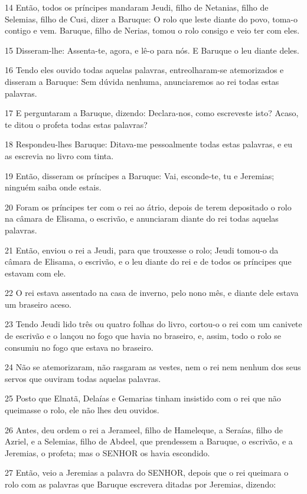 \par 14 Então, todos os príncipes mandaram Jeudi, filho de Netanias, filho de Selemias, filho de Cusi, dizer a Baruque: O rolo que leste diante do povo, toma-o contigo e vem. Baruque, filho de Nerias, tomou o rolo consigo e veio ter com eles.
\par 15 Disseram-lhe: Assenta-te, agora, e lê-o para nós. E Baruque o leu diante deles.
\par 16 Tendo eles ouvido todas aquelas palavras, entreolharam-se atemorizados e disseram a Baruque: Sem dúvida nenhuma, anunciaremos ao rei todas estas palavras.
\par 17 E perguntaram a Baruque, dizendo: Declara-nos, como escreveste isto? Acaso, te ditou o profeta todas estas palavras?
\par 18 Respondeu-lhes Baruque: Ditava-me pessoalmente todas estas palavras, e eu as escrevia no livro com tinta.
\par 19 Então, disseram os príncipes a Baruque: Vai, esconde-te, tu e Jeremias; ninguém saiba onde estais.
\par 20 Foram os príncipes ter com o rei ao átrio, depois de terem depositado o rolo na câmara de Elisama, o escrivão, e anunciaram diante do rei todas aquelas palavras.
\par 21 Então, enviou o rei a Jeudi, para que trouxesse o rolo; Jeudi tomou-o da câmara de Elisama, o escrivão, e o leu diante do rei e de todos os príncipes que estavam com ele.
\par 22 O rei estava assentado na casa de inverno, pelo nono mês, e diante dele estava um braseiro aceso.
\par 23 Tendo Jeudi lido três ou quatro folhas do livro, cortou-o o rei com um canivete de escrivão e o lançou no fogo que havia no braseiro, e, assim, todo o rolo se consumiu no fogo que estava no braseiro.
\par 24 Não se atemorizaram, não rasgaram as vestes, nem o rei nem nenhum dos seus servos que ouviram todas aquelas palavras.
\par 25 Posto que Elnatã, Delaías e Gemarias tinham insistido com o rei que não queimasse o rolo, ele não lhes deu ouvidos.
\par 26 Antes, deu ordem o rei a Jerameel, filho de Hameleque, a Seraías, filho de Azriel, e a Selemias, filho de Abdeel, que prendessem a Baruque, o escrivão, e a Jeremias, o profeta; mas o SENHOR os havia escondido.
\par 27 Então, veio a Jeremias a palavra do SENHOR, depois que o rei queimara o rolo com as palavras que Baruque escrevera ditadas por Jeremias, dizendo:
